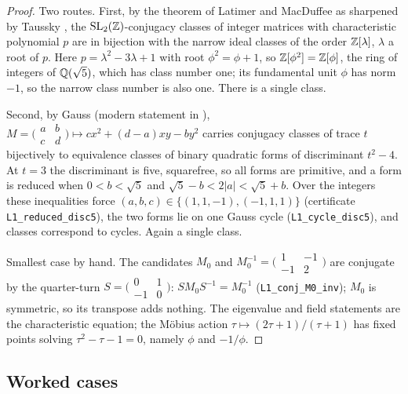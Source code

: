 \documentclass[11pt,a4paper]{article}
\theoremstyle{plain}
\theoremstyle{definition}
\theoremstyle{remark}
\begin{document}
\begin{proof}
Two routes. First, by the theorem of Latimer and MacDuffee \cite{LatimerMacDuffee1933} as sharpened by Taussky \cite{Taussky1949}, the $\mathrm{SL}_{2}(\mathbb{Z})$-conjugacy classes of integer matrices with characteristic polynomial $p$ are in bijection with the narrow ideal classes of the order $\mathbb{Z}[\lambda]$, $\lambda$ a root of $p$. Here $p=\lambda^{2}-3\lambda+1$ with root $\phi^{2}=\phi+1$, so $\mathbb{Z}[\phi^{2}]=\mathbb{Z}[\phi]$, the ring of integers of $\mathbb{Q}(\sqrt5)$, which has class number one; its fundamental unit $\phi$ has norm $-1$, so the narrow class number is also one. There is a single class.

Second, by Gauss \cite{Gauss1801} (modern statement in \cite{Sarnak1982}), $M=\bigl(\begin{smallmatrix}a&b\\c&d\end{smallmatrix}\bigr)\mapsto cx^{2}+(d-a)xy-by^{2}$ carries conjugacy classes of trace $t$ bijectively to equivalence classes of binary quadratic forms of discriminant $t^{2}-4$. At $t=3$ the discriminant is five, squarefree, so all forms are primitive, and a form is reduced when $0<b<\sqrt5$ and $\sqrt5-b<2\lvert a\rvert<\sqrt5+b$. Over the integers these inequalities force $(a,b,c)\in\{(1,1,-1),(-1,1,1)\}$ (certificate \texttt{L1\_reduced\_disc5}), the two forms lie on one Gauss cycle (\texttt{L1\_cycle\_disc5}), and classes correspond to cycles. Again a single class.

Smallest case by hand. The candidates $M_{0}$ and $M_{0}^{-1}=\bigl(\begin{smallmatrix}1&-1\\-1&2\end{smallmatrix}\bigr)$ are conjugate by the quarter-turn $S=\bigl(\begin{smallmatrix}0&1\\-1&0\end{smallmatrix}\bigr)$: $SM_{0}S^{-1}=M_{0}^{-1}$ (\texttt{L1\_conj\_M0\_inv}); $M_{0}$ is symmetric, so its transpose adds nothing. The eigenvalue and field statements are the characteristic equation; the M\"obius action $\tau\mapsto(2\tau+1)/(\tau+1)$ has fixed points solving $\tau^{2}-\tau-1=0$, namely $\phi$ and $-1/\phi$.
\end{proof}

\subsection{Worked cases}\label{sec:drive-worked}
\end{document}
